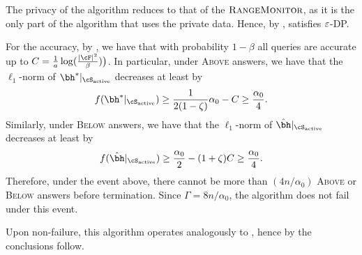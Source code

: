 \begin{proofof}{}
The privacy of the algorithm reduces to that of the $\textsc{RangeMonitor}$, as it is the only part of the algorithm that uses the private data. Hence, by ,  satisfies $\varepsilon$-DP.

For the accuracy, by , we have that with probability $1-\beta$ all queries are accurate up to $C=\frac1a\log(\frac{|\cF|^2}{\beta})\big)$. In particular, under \textsc{Above} answers, we have that the $\ell_1$-norm of $\bh^{\ast}|_{\cS_{\acti}}$ decreases at least by
\[ f(\bh^{\ast}|_{\cS_{\acti}}) \geq \frac{1}{2(1-\zeta)}\alpha_0-C\geq \frac{\alpha_0}{4}.  \]
Similarly, under \textsc{Below} answers, we have that the $\ell_1$-norm of $\hbh|_{\cS_{\acti}}$ decreases at least by
\[ f(\hbh|_{\cS_{\acti}}) \geq \frac{\alpha_0}{2}-(1+\zeta)C\geq \frac{\alpha_0}{4}. \]
Therefore, under the event above, there cannot be more than $(4n/\alpha_0)$ \textsc{Above} or \textsc{Below} answers  before termination. Since $\Gamma=8n/\alpha_0$, the algorithm does not fail under this event.

Upon non-failure, this algorithm operates analogously to , hence by  the conclusions follow.
\end{proofof}
